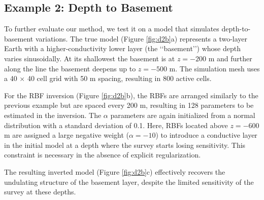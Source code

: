 \documentclass{segabs}
\begin{document}
\subsection{Example 2: Depth to Basement}
\vspace{-0.4cm}

To further evaluate our method, we test it on a model that simulates depth-to-basement variations. The true model (Figure \ref{fig:d2b}a) represents a two-layer Earth with a higher-conductivity lower layer (the \lq\lq basement\rq\rq) whose depth varies sinusoidally. At its shallowest the basement is at $z=-200$ m and further along the line the basement deepens up to $z=-500$ m. The simulation mesh uses a 40 $\times$ 40 cell grid with 50 m spacing, resulting in 800 active cells.

For the RBF inversion (Figure \ref{fig:d2b}b), the RBFs are arranged similarly to the previous example but are spaced every 200 m, resulting in 128 parameters to be estimated in the inversion. The $\alpha$ parameters are again initialized from a normal distribution with a standard deviation of 0.1. Here, RBFs located above $z = -600$ m are assigned a large negative weight ($\alpha = -10$) to introduce a conductive layer in the initial model at a depth where the survey starts losing sensitivity. This constraint is necessary in the absence of explicit regularization.

The resulting inverted model (Figure \ref{fig:d2b}c) effectively recovers the undulating structure of the basement layer, despite the limited sensitivity of the survey at these depths.
\end{document}
